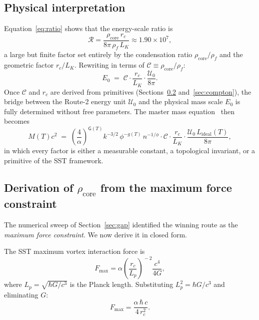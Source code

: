 \documentclass[11pt,a4paper]{article}
\newcommand{\rc}{r_c}
\newcommand{\rhof}{\rho_{\!f}}
\newcommand{\rhocore}{\rho_{\!\mathrm{core}}}
\begin{document}
\subsection{Physical interpretation}

Equation~\eqref{eq:ratio} shows that the energy-scale ratio is
\begin{equation}
  \mathcal{R}
  = \frac{\rhocore\,\rc}{8\pi\,\rhof\,L_K}
  \approx 1.90\times10^7,
\end{equation}
a large but finite factor set entirely by the condensation ratio
$\rhocore/\rhof$ and the geometric factor $\rc/L_K$.  Rewriting
in terms of $\mathcal{C}\equiv\rhocore/\rhof$:
\begin{equation}
  E_0
  \;=\; \mathcal{C}\cdot\frac{\rc}{L_K}\cdot\frac{\mathcal{U}_0}{8\pi}.
  \label{eq:E0_from_condensation}
\end{equation}
Once $\mathcal{C}$ and $\rc$ are derived from primitives
(Sections~\ref{subsec:rhocore} and~\ref{sec:compton}), the bridge
between the Route-2 energy unit $\mathcal{U}_0$ and the physical
mass scale $E_0$ is fully determined without free parameters.
The master mass equation~\cite{IskandaraniSST59} then becomes
\begin{equation}
  M(T)c^2
  \;=\;
  \left(\frac{4}{\alpha}\right)^{\mathsf{G}(T)}
  k^{-3/2}\,\phi^{-g(T)}\,n^{-1/\phi}
  \cdot \mathcal{C}\cdot\frac{\rc}{L_K}\cdot
  \frac{\mathcal{U}_0\,L_{\mathrm{ideal}}(T)}{8\pi},
  \label{eq:master_revised}
\end{equation}
in which every factor is either a measurable constant, a
topological invariant, or a primitive of the SST framework.

\subsection{Derivation of $\rhocore$ from the maximum force constraint}
\label{subsec:rhocore}

The numerical sweep of Section~\ref{sec:gap} identified the winning
route as the \emph{maximum force constraint}.  We now derive it in
closed form.

The SST maximum vortex interaction force is~\cite{IskandaraniCanon078}
\begin{equation}
  F_{\max}
  = \alpha\!\left(\frac{\rc}{L_p}\right)^{\!-2}\frac{c^4}{4G},
  \label{eq:Fmax_def}
\end{equation}
where $L_p=\sqrt{\hbar G/c^3}$ is the Planck length.  Substituting
$L_p^2=\hbar G/c^3$ and eliminating $G$:
\begin{equation}
  F_{\max}
  = \frac{\alpha\,\hbar\,c}{4\,\rc^2}.
  \label{eq:Fmax_simplified}
\end{equation}
\end{document}
